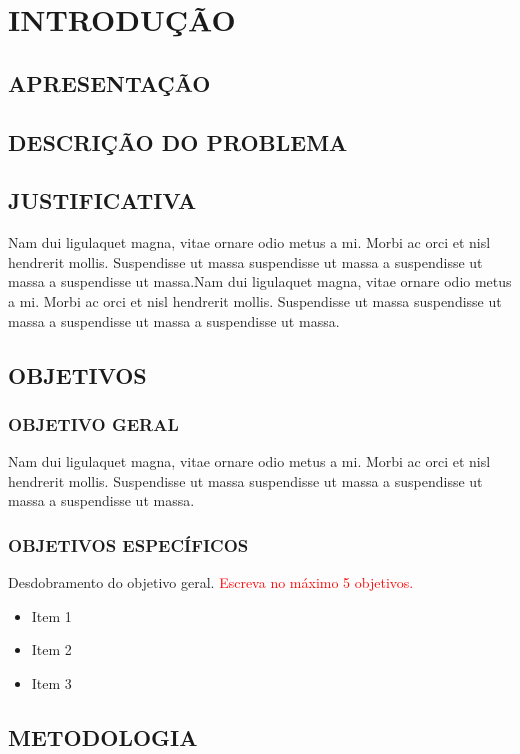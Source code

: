 \chapter{INTRODUÇÃO} %
\lipsum[1-2]
\section{APRESENTAÇÃO}
\lipsum[1-1]

\section{DESCRIÇÃO DO PROBLEMA}
\lipsum[1-1]

\section{JUSTIFICATIVA}
Nam dui ligulaquet magna, vitae ornare odio metus a mi. Morbi ac orci et nisl hendrerit mollis. Suspendisse ut massa suspendisse ut massa a suspendisse ut massa a suspendisse ut massa.Nam dui ligulaquet magna, vitae ornare odio metus a mi. Morbi ac orci et nisl hendrerit mollis. Suspendisse ut massa suspendisse ut massa a suspendisse ut massa a suspendisse ut massa.

\section{OBJETIVOS}

\subsection{OBJETIVO GERAL}
Nam dui ligulaquet magna, vitae ornare odio metus a mi. Morbi ac orci et nisl hendrerit mollis. Suspendisse ut massa suspendisse ut massa a suspendisse ut massa a suspendisse ut massa.

\subsection{OBJETIVOS ESPECÍFICOS}
Desdobramento do objetivo geral. \textcolor{red}{Escreva no máximo 5 objetivos.}
 \begin{itemize}
	\item Item 1
	\item Item 2
	\item Item 3
\end{itemize}

 \section{METODOLOGIA}
 \lipsum[1-1]